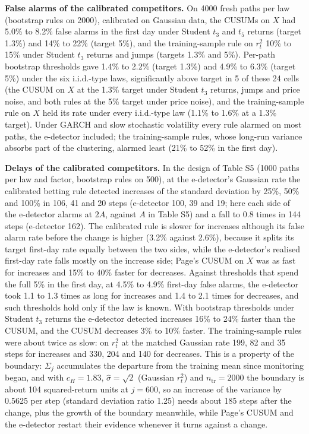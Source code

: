 \documentclass[
]{article}
\begin{document}
\textbf{False alarms of the calibrated competitors.} On 4000 fresh paths
per law (bootstrap rules on 2000), calibrated on Gaussian data, the
CUSUMs on \(X\) had 5.0\% to 8.2\% false alarms in the first day under
Student \(t_3\) and \(t_5\) returns (target 1.3\%) and 14\% to 22\%
(target 5\%), and the training-sample rule on \(r_t^2\) 10\% to 15\%
under Student \(t_3\) returns and jumps (targets 1.3\% and 5\%).
Per-path bootstrap thresholds gave 1.4\% to 2.2\% (target 1.3\%) and
4.9\% to 6.3\% (target 5\%) under the six i.i.d.-type laws,
significantly above target in 5 of these 24 cells (the CUSUM on \(X\) at
the 1.3\% target under Student \(t_3\) returns, jumps and price noise,
and both rules at the 5\% target under price noise), and the
training-sample rule on \(X\) held its rate under every i.i.d.-type law
(1.1\% to 1.6\% at a 1.3\% target). Under GARCH and slow stochastic
volatility every rule alarmed on most paths, the e-detector included;
the training-sample rules, whose long-run variance absorbs part of the
clustering, alarmed least (21\% to 52\% in the first day).

\textbf{Delays of the calibrated competitors.} In the design of Table S5
(1000 paths per law and factor, bootstrap rules on 500), at the
e-detector's Gaussian rate the calibrated betting rule detected
increases of the standard deviation by 25\%, 50\% and 100\% in 106, 41
and 20 steps (e-detector 100, 39 and 19; here each side of the
e-detector alarms at \(2A\), against \(A\) in Table S5) and a fall to
0.8 times in 144 steps (e-detector 162). The calibrated rule is slower
for increases although its false alarm rate before the change is higher
(3.2\% against 2.6\%), because it splits its target first-day rate
equally between the two sides, while the e-detector's realised first-day
rate falls mostly on the increase side; Page's CUSUM on \(X\) was as
fast for increases and 15\% to 40\% faster for decreases. Against
thresholds that spend the full 5\% in the first day, at 4.5\% to 4.9\%
first-day false alarms, the e-detector took 1.1 to 1.3 times as long for
increases and 1.4 to 2.1 times for decreases, and such thresholds hold
only if the law is known. With bootstrap thresholds under Student
\(t_3\) returns the e-detector detected increases 16\% to 24\% faster
than the CUSUM, and the CUSUM decreases 3\% to 10\% faster. The
training-sample rules were about twice as slow: on \(r_t^2\) at the
matched Gaussian rate 199, 82 and 35 steps for increases and 330, 204
and 140 for decreases. This is a property of the boundary: \(\Sigma_j\)
accumulates the departure from the training mean since monitoring began,
and with \(c_H = 1.83\), \(\hat\sigma = \sqrt 2\) (Gaussian \(r_t^2\))
and \(n_{\mathrm{tr}} = 2000\) the boundary is about 104 squared-return
units at \(j = 600\), so an increase of the variance by 0.5625 per step
(standard deviation ratio 1.25) needs about 185 steps after the change,
plus the growth of the boundary meanwhile, while Page's CUSUM and the
e-detector restart their evidence whenever it turns against a change.
\end{document}
